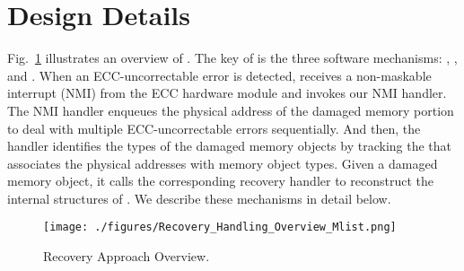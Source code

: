 \section{Design Details}
\label{sec:design}
Fig.~\ref{Recovery_Handling_Overview} illustrates an overview of {\sysname}. The key of {\sysname} is the three software mechanisms: \emph{\rh}, \emph{\alist}, and \emph{\nmiq}. When an ECC-uncorrectable error is detected, {\sysname} receives a non-maskable interrupt (NMI) from the ECC hardware module and invokes our NMI handler. The NMI handler enqueues the physical address of the damaged memory portion to deal with multiple ECC-uncorrectable errors sequentially. And then, the handler identifies the types of the damaged memory objects by tracking the {\alist} that associates the physical addresses with memory object types. Given a damaged memory object, it calls the corresponding recovery handler to reconstruct the internal structures of {\sysname}. We describe these mechanisms in detail below.

\begin{figure}[t]
  \centering
  \texttt{[image: ./figures/Recovery\_Handling\_Overview\_Mlist.png]}
  \vspace*{-2.5mm}
  \caption{Recovery Approach Overview.\label{Recovery_Handling_Overview}}
  \vspace*{-6.5mm}
\end{figure}

